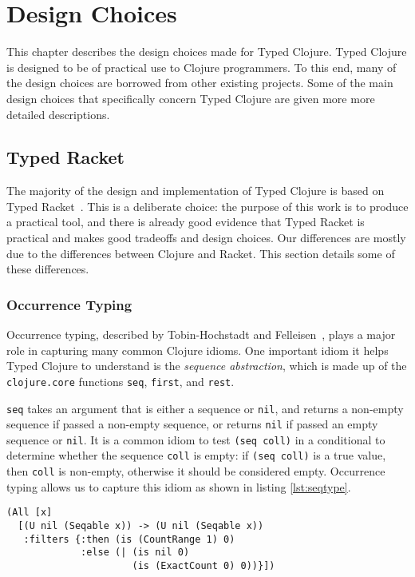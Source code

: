 \chapter{Design Choices}

This chapter describes the design choices made for Typed Clojure.
Typed Clojure is designed to be of practical use to Clojure programmers.
To this end, many of the design choices are borrowed from other existing projects.
Some of the main design choices that specifically concern Typed Clojure are given more
more detailed descriptions.

\section{Typed Racket}

The majority of the design and implementation of Typed Clojure is based on Typed Racket~\cite{Tob10}.
This is a deliberate choice: the purpose of this work is to produce
a practical tool, and there is already good evidence that Typed Racket
is practical and makes good tradeoffs and design choices.
Our differences are mostly due to the differences between Clojure and Racket.
This section details some of these differences.

\subsection{Occurrence Typing}

Occurrence typing, described by Tobin-Hochstadt and Felleisen~\cite{TF10},
plays a major role in capturing many common Clojure idioms.
One important idiom it helps Typed Clojure to understand 
is the \emph{sequence abstraction}, which
is made up of the \lstinline|clojure.core| functions \lstinline|seq|, \lstinline|first|, and \lstinline|rest|.

\lstinline|seq| takes an argument that is either a sequence or \lstinline|nil|,
and returns a non-empty sequence if passed a non-empty sequence, or returns
\lstinline|nil| if passed an empty sequence or \lstinline|nil|.
It is a common idiom to test \lstinline|(seq coll)| in a conditional
to determine whether the sequence \lstinline|coll| is empty:
if \lstinline|(seq coll)| is a true value, then \lstinline|coll|
is non-empty, otherwise it should be considered empty.
Occurrence typing allows us to capture this idiom as shown in
listing \ref{lst:seqtype}.

\begin{lstlisting}[caption=Type assiciated with clojure.core/seq, label=lst:seqtype]
(All [x]
  [(U nil (Seqable x)) -> (U nil (Seqable x))
   :filters {:then (is (CountRange 1) 0)
             :else (| (is nil 0)
                      (is (ExactCount 0) 0))}])
\end{lstlisting}

